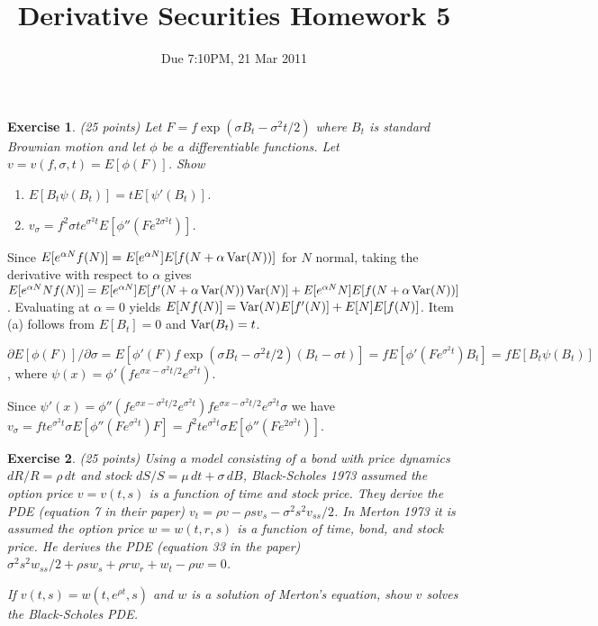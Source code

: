 \documentclass[11pt,fleqn]{amsproc}
\newcommand{\Var}{\mathop{\rm{Var}}}
\newtheorem{xca}{Exercise}
\begin{document}
\title{Derivative Securities Homework 5}
\author{Due 7:10PM, 21 Mar 2011}

\maketitle

\begin{xca}{(25 points)}
Let $F = f\exp(\sigma B_t - \sigma^2t/2)$ where $B_t$ is
standard Brownian motion and let
$\phi$ be a differentiable functions. Let $v =
v(f,\sigma,t) = E[\phi(F)]$. Show
\begin{enumerate}
\item $E[B_t\psi(B_t)] = tE[\psi'(B_t)]$.
\item $v_\sigma = f^2\sigma te^{\sigma^2t}E[\phi''(Fe^{2\sigma^2t})]$.
\end{enumerate}
\end{xca}

Since $E[e^{\alpha N}f(N)] = E[e^{\alpha N}] E[f(N + \alpha\Var(N))]$
for $N$ normal, taking the derivative with respect to $\alpha$ gives
$E[e^{\alpha N}N f(N)] = E[e^{\alpha N}] E[f'(N + \alpha\Var(N))\Var(N)]
+ E[e^{\alpha N}N] E[f(N + \alpha\Var(N))]$. Evaluating at $\alpha = 0$
yields $E[N f(N)] = \Var(N) E[f'(N)] + E[N]E[f(N)]$. Item (a) follows
from $E[B_t] = 0$ and $\Var(B_t) = t$.

$\partial E[\phi(F)]/\partial\sigma
= E[\phi'(F)f\exp(\sigma B_t - \sigma^2t/2)(B_t - \sigma t)]
= f E[\phi'(Fe^{\sigma^2 t})B_t] = f E[B_t\psi(B_t)]$, where
$\psi(x) = \phi'(fe^{\sigma x - \sigma^2 t/2}e^{\sigma^2 t})$.

Since $\psi'(x) = \phi''(fe^{\sigma x - \sigma^2 t/2}e^{\sigma^2 t})
fe^{\sigma x - \sigma^2 t/2}e^{\sigma^2 t}\sigma$ we have
$v_\sigma = fte^{\sigma^2 t}\sigma E[\phi''(Fe^{\sigma^2 t})F]
= f^2te^{\sigma^2 t}\sigma E[\phi''(Fe^{2\sigma^2 t})]$.

\begin{xca}{(25 points)}
Using a model consisting of a bond with price dynamics
$dR/R = \rho\,dt$ and stock $dS/S = \mu\,dt + \sigma\,dB$,
Black-Scholes 1973 assumed the option price $v = v(t, s)$
is a function of time and stock price.
They derive the PDE (equation 7 in their paper)
$v_t = \rho v - \rho sv_s - \sigma^2 s^2 v_{ss}/2$. In Merton 1973
it is assumed the option price $w = w(t, r, s)$ is a function
of time, bond, and stock price. He derives the PDE (equation 33
in the paper)
$\sigma^2 s^2 w_{ss}/2 + \rho sw_s + \rho r w_r + w_t - \rho w = 0$.

If $v(t, s) = w(t, e^{\rho t}, s)$ and $w$ is a solution of
Merton's equation, show $v$ solves the Black-Scholes PDE.
\end{xca}
\end{document}
